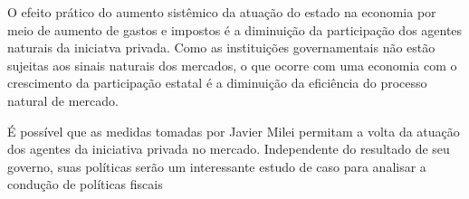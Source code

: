 \documentclass[a4paper, 12pt, openany, oneside, brazil]{abntex2}
\begin{document}
O efeito prático do aumento sistêmico da atuação do estado na economia por meio de aumento de gastos e impostos é a diminuição da participação dos agentes naturais da iniciatva privada. Como as instituições governamentais não estão sujeitas aos sinais naturais dos mercados, o que ocorre com uma economia com o crescimento da participação estatal é a diminuição da eficiência do processo natural de mercado.

É possível que as medidas tomadas por Javier Milei permitam a volta da atuação dos agentes da iniciativa privada no mercado. Independente do resultado de seu governo, suas políticas serão um interessante estudo de caso para analisar a condução de políticas fiscais



\postextual



%







% 
% 
%



% 



\end{document}
